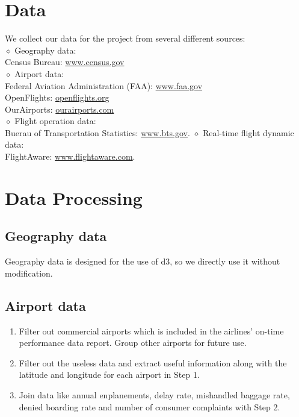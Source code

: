 \documentclass[12pt]{article}
\begin{document}
\section{Data}
    \noindent We collect our data for the project from several different sources:\\
    $\diamond$ Geography data:\\
    \indent Census Bureau: \url{www.census.gov}\\
    $\diamond$ Airport data:\\
    \indent Federal Aviation Administration (FAA): \url{www.faa.gov}\\
    \indent OpenFlights: \url{openflights.org}\\
    \indent OurAirports: \url{ourairports.com}\\
    $\diamond$ Flight operation data:\\
    \indent Buerau of Transportation Statistics: \url{www.bts.gov}.
    $\diamond$ Real-time flight dynamic data:\\
    \indent FlightAware: \url{www.flightaware.com}.

\section{Data Processing}
    \subsection{Geography data}
    Geography data is designed for the use of d3, so we directly use it without modification.

    \subsection{Airport data}
    \begin{enumerate}
    \item Filter out commercial airports which is included in the airlines' on-time performance data report. Group other airports for future use.
    \item Filter out the useless data and extract useful information along with the latitude and longitude for each airport in Step 1.
    \item Join data like annual enplanements, delay rate, mishandled baggage rate, denied boarding rate and number of consumer complaints with Step 2.
    \end{enumerate}
\end{document}
